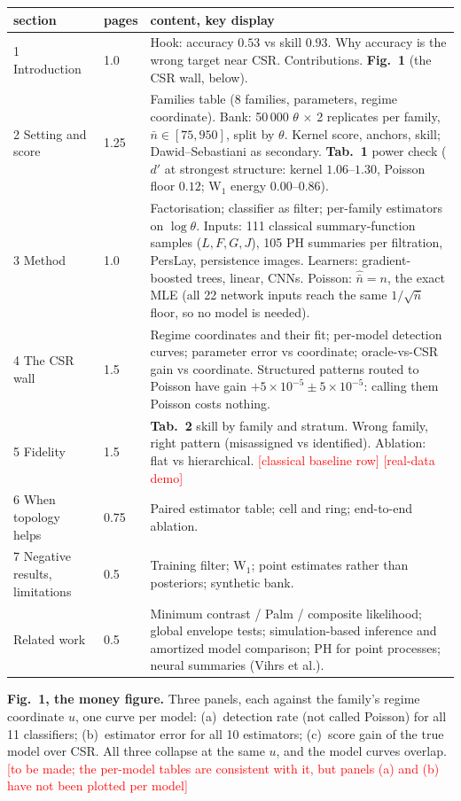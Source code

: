 \documentclass[11pt]{article}
\newcommand{\nb}{\bar n}
\newcommand{\pending}[1]{\textcolor{red}{[#1]}}
\begin{document}
\begin{tabularx}{\linewidth}{@{}p{3.6cm}p{0.9cm}X@{}}
\toprule
section & pages & content, key display \\
\midrule
1 Introduction & 1.0 & Hook: accuracy $0.53$ vs skill $0.93$. Why accuracy is the wrong target near CSR. Contributions.
  \textbf{Fig.~1} (the CSR wall, below). \\
2 Setting and score & 1.25 & Families table (8 families, parameters, regime coordinate). Bank: 50\,000 $\theta$ $\times$ 2
  replicates per family, $\nb\in[75,950]$, split by $\theta$. Kernel score, anchors, skill; Dawid--Sebastiani
  as secondary. \textbf{Tab.~1} power check ($d'$ at strongest structure: kernel $1.06$--$1.30$, Poisson floor
  $0.12$; W$_1$ energy $0.00$--$0.86$). \\
3 Method & 1.0 & Factorisation; classifier as filter; per-family estimators on $\log\theta$. Inputs: 111
  classical summary-function samples ($L,F,G,J$), 105 PH summaries per filtration, PersLay, persistence images.
  Learners: gradient-boosted trees, linear, CNNs. Poisson: $\hat{\nb}=n$, the exact MLE (all 22 network inputs
  reach the same $1/\sqrt{\nb}$ floor, so no model is needed). \\
4 The CSR wall & 1.5 & Regime coordinates and their fit; per-model detection curves; parameter error vs coordinate;
  oracle-vs-CSR gain vs coordinate. Structured patterns routed to Poisson have gain $+5{\times}10^{-5}\pm5{\times}10^{-5}$:
  calling them Poisson costs nothing. \\
5 Fidelity & 1.5 & \textbf{Tab.~2} skill by family and stratum. Wrong family, right pattern (misassigned vs
  identified). Ablation: flat vs hierarchical. \pending{classical baseline row} \pending{real-data demo} \\
6 When topology helps & 0.75 & Paired estimator table; cell and ring; end-to-end ablation. \\
7 Negative results, limitations & 0.5 & Training filter; W$_1$; point estimates rather than posteriors;
  synthetic bank. \\
Related work & 0.5 & Minimum contrast / Palm / composite likelihood; global envelope tests; simulation-based
  inference and amortized model comparison; PH for point processes; neural summaries (Vihrs et al.). \\
\bottomrule
\end{tabularx}

\textbf{Fig.~1, the money figure.} Three panels, each against the family's regime coordinate $u$, one curve per
model: (a)~detection rate (not called Poisson) for all 11 classifiers; (b)~estimator error for all 10 estimators;
(c)~score gain of the true model over CSR. All three collapse at the same $u$, and the model curves overlap.
\pending{to be made; the per-model tables are consistent with it, but panels (a) and (b) have not been plotted per model}
\end{document}

